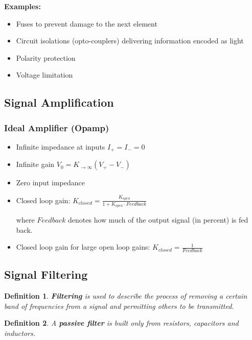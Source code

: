 \documentclass[10pt,a4paper]{scrartcl}
\newtheorem{define}{Definition}
\begin{document}
\begin{multicols*}{2}
\textbf{Examples:}

\begin{itemize}
\item Fuses to prevent damage to the next element
\item Circuit isolations (opto-couplers) delivering information encoded as light
\item Polarity protection
\item Voltage limitation
\end{itemize}

\subsection{Signal Amplification}

\subsubsection{Ideal Amplifier (Opamp)}


\begin{itemize}
\item Infinite impedance at inputs $I_+ = I_-=0$
\item Infinite gain $V_0=K_{\rightarrow\infty}(V_+-V_-)$
\item Zero input impedance
\item Closed loop gain: $K_{closed} = \frac{K_{open}}{1+K_{open}\cdot Feedback}$

where $Feedback$ denotes how much of the output signal (in percent) is fed back.
\item Closed loop gain for large open loop gains: $K_{closed}=\frac{1}{Feedback}$
\end{itemize}


\subsection{Signal Filtering}

\begin{define}
\textbf{Filtering} is used to describe the process of removing a certain band of frequencies from a signal and permitting others to be transmitted.
\end{define}

\begin{define}
A \textbf{passive filter} is built only from resistors, capacitors and inductors.


\end{define}
\end{multicols*}
\end{document}
